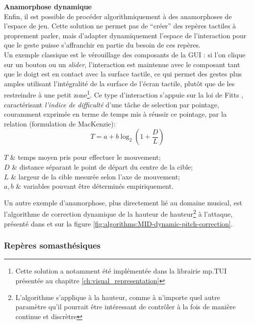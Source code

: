 \noindent\textbf{Anamorphose dynamique}\\
\noindent Enfin, il est possible de procéder algorithmiquement à des anamorphoses de l'espace de jeu. Cette solution ne permet pas de ``créer'' des repères tactiles à proprement parler, mais d'adapter dynamiquement l'espace de l'interaction pour que le geste puisse s'affranchir en partie du besoin de ces repères.\\
\indent Un exemple classique est le vérouillage des composants de la \gls{GUI} : si l'on clique sur un bouton ou un \textit{slider}, l'interaction est maintenue avec le composant tant que le doigt est en contact avec la surface tactile, ce qui permet des gestes plus amples utilisant l'intégralité de la surface de l'écran tactile, plutôt que de les restreindre à une petit zone\footnote{Cette solution a notamment été implémentée dans la librairie mp.TUI présentée au chapitre \ref{ch:visual_representation}}. Ce type d'interaction s'appuie sur la loi de Fitts \cite{fitts_information_1954}, caractérisant \textit{l'indice de difficulté} d'une tâche de selection par pointage, couramment exprimée en terme de temps mis à réussir ce pointage, par la relation (formulation de MacKenzie): 
$$ T = a + b \log_2 (1 + \frac{D}{L})$$
\vspace{-1em}
\begin{conditions}
$T$     	& temps moyen pris pour effectuer le mouvement; \\
$D$			& distance séparant le point de départ du centre de la cible;\\
$L$			& largeur de la cible mesurée selon l'axe de mouvement;\\
$a, b$  	& variables pouvant être déterminés empiriquement.
\end{conditions}

\noindent Un autre exemple d'anamorphose, plus directement lié au domaine musical, est l'algorithme de correction dynamique de la hauteur de hauteur\footnote{L'algorithme s'applique à la hauteur, comme à n'importe quel autre paramètre qu'il pourrait être intéressant de contrôler à la fois de manière continue et discrètre} à l'attaque, présenté dans \cite{goudard_playing_2014} et sur la figure \ref{fig:algorithms:MID-dynamic-pitch-correction}.

\subsubsection{Repères somasthésiques}

